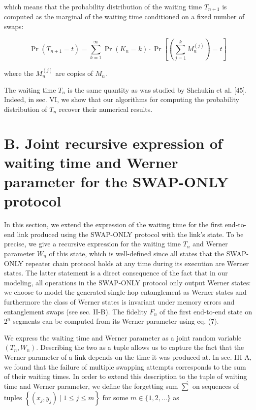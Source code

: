 \documentclass[10pt]{article}
\begin{document}
which means that the probability distribution of the waiting time $T_{n+1}$ is computed as the marginal of the waiting time conditioned on a fixed number of swaps:

$$
\operatorname{Pr}\left(T_{n+1}=t\right)=\sum_{k=1}^{\infty} \operatorname{Pr}\left(K_{n}=k\right) \cdot \operatorname{Pr}\left[\left(\sum_{j=1}^{k} M_{n}^{(j)}\right)=t\right]
$$

where the $M_{n}^{(j)}$ are copies of $M_{n}$.

The waiting time $T_{n}$ is the same quantity as was studied by Shchukin et al. [45]. Indeed, in sec. VI, we show that our algorithms for computing the probability distribution of $T_{n}$ recover their numerical results.

\section*{B. Joint recursive expression of waiting time and Werner parameter for the SWAP-ONLY protocol}
In this section, we extend the expression of the waiting time for the first end-to-end link produced using the SWAP-ONLY protocol with the link's state. To be precise, we give a recursive expression for the waiting time $T_{n}$ and Werner parameter $W_{n}$ of this state, which is well-defined since all states that the SWAP-ONLY repeater chain protocol holds at any time during its execution are Werner states. The latter statement is a direct consequence of the fact that in our modeling, all operations in the SWAP-ONLY protocol only output Werner states: we choose to model the generated single-hop entanglement as Werner states and furthermore the class of Werner states is invariant under memory errors and entanglement swaps (see sec. II-B). The fidelity $F_{n}$ of the first end-to-end state on $2^{n}$ segments can be computed from its Werner parameter using eq. (7).

We express the waiting time and Werner parameter as a joint random variable $\left(T_{n}, W_{n}\right)$. Describing the two as a tuple allows us to capture the fact that the Werner parameter of a link depends on the time it was produced at. In sec. III-A, we found that the failure of multiple swapping attempts corresponds to the sum of their waiting times. In order to extend this description to the tuple of waiting time and Werner parameter, we define the forgetting sum $\widehat{\sum}$ on sequences of tuples $\left\{\left(x_{j}, y_{j}\right) \mid 1 \leq j \leq m\right\}$ for some $m \in\{1,2, \ldots\}$ as
\end{document}

